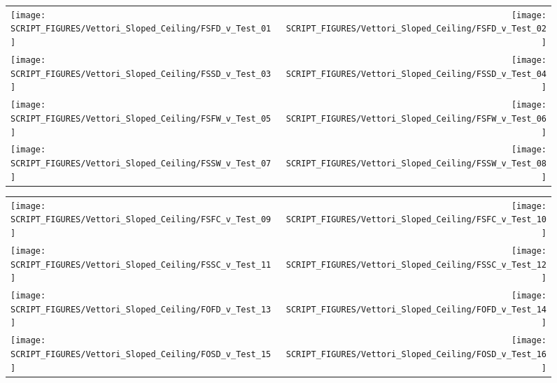 \begin{figure}[!ht]
\begin{tabular*}{\textwidth}{l@{\extracolsep{\fill}}r}
\texttt{[image: SCRIPT\_FIGURES/Vettori\_Sloped\_Ceiling/FSFD\_v\_Test\_01]} &
\texttt{[image: SCRIPT\_FIGURES/Vettori\_Sloped\_Ceiling/FSFD\_v\_Test\_02]} \\
\texttt{[image: SCRIPT\_FIGURES/Vettori\_Sloped\_Ceiling/FSSD\_v\_Test\_03]} &
\texttt{[image: SCRIPT\_FIGURES/Vettori\_Sloped\_Ceiling/FSSD\_v\_Test\_04]} \\
\texttt{[image: SCRIPT\_FIGURES/Vettori\_Sloped\_Ceiling/FSFW\_v\_Test\_05]} &
\texttt{[image: SCRIPT\_FIGURES/Vettori\_Sloped\_Ceiling/FSFW\_v\_Test\_06]} \\
\texttt{[image: SCRIPT\_FIGURES/Vettori\_Sloped\_Ceiling/FSSW\_v\_Test\_07]} &
\texttt{[image: SCRIPT\_FIGURES/Vettori\_Sloped\_Ceiling/FSSW\_v\_Test\_08]} \\
\end{tabular*}
\label{Vettori_Sloped_1}
\end{figure}

\begin{figure}[!ht]
\begin{tabular*}{\textwidth}{l@{\extracolsep{\fill}}r}
\texttt{[image: SCRIPT\_FIGURES/Vettori\_Sloped\_Ceiling/FSFC\_v\_Test\_09]} &
\texttt{[image: SCRIPT\_FIGURES/Vettori\_Sloped\_Ceiling/FSFC\_v\_Test\_10]} \\
\texttt{[image: SCRIPT\_FIGURES/Vettori\_Sloped\_Ceiling/FSSC\_v\_Test\_11]} &
\texttt{[image: SCRIPT\_FIGURES/Vettori\_Sloped\_Ceiling/FSSC\_v\_Test\_12]} \\
\texttt{[image: SCRIPT\_FIGURES/Vettori\_Sloped\_Ceiling/FOFD\_v\_Test\_13]} &
\texttt{[image: SCRIPT\_FIGURES/Vettori\_Sloped\_Ceiling/FOFD\_v\_Test\_14]} \\
\texttt{[image: SCRIPT\_FIGURES/Vettori\_Sloped\_Ceiling/FOSD\_v\_Test\_15]} &
\texttt{[image: SCRIPT\_FIGURES/Vettori\_Sloped\_Ceiling/FOSD\_v\_Test\_16]} \\
\end{tabular*}
\label{Vettori_Sloped_2}
\end{figure}

